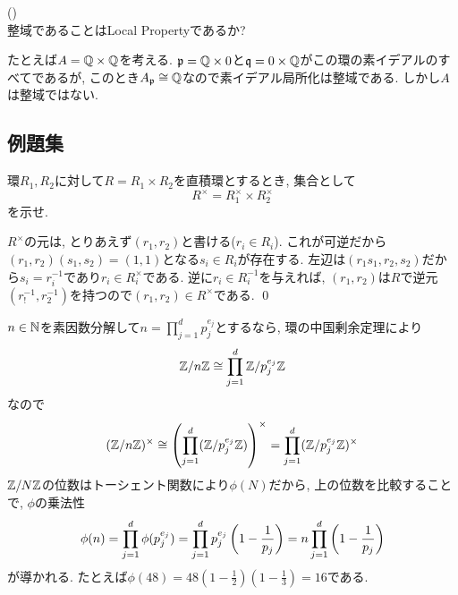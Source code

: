 \begin{egprob} () \\
整域であることはLocal Propertyであるか?
\end{egprob}
\begin{egans}
 たとえば$A=\mathbb{Q}\times \mathbb{Q}$を考える. $\mathfrak{p} = \mathbb{Q}\times 0$と$\mathfrak{q} = 0\times \mathbb{Q}$がこの環の素イデアルのすべてであるが, このとき$A_{\mathfrak{p}} \cong \mathbb{Q}$なので素イデアル局所化は整域である. しかし$A$は整域ではない. \\

\end{egans}













\subsection{例題集}

\begin{egprob}
環$R_1,R_2$に対して$R=R_1\times R_2$を直積環とするとき, 集合として
\[R^{\times} = R_1^{\times} \times R_2^{\times}\]
を示せ.
\end{egprob}
\begin{egans}
$R^{\times}$の元は, とりあえず$(r_1,r_2)$と書ける($r_i \in R_i$). これが可逆だから$(r_1,r_2)(s_1,s_2)=(1,1)$となる$s_i\in R_i$が存在する. 左辺は$(r_1s_1, r_2,s_2)$だから$s_i = r_i^{-1}$であり$r_i \in R_i^{\times}$である. 逆に$r_i\in R_i^{-1}$を与えれば, $(r_1,r_2)$は$R$で逆元$(r_!^{-1}, r_2^{-1})$を持つので$(r_1,r_2)\in R^{\times}$である. \qed
\end{egans}
\begin{eg}
$n\in \mathbb{N}$を素因数分解して$n=\prod_{j=1}^{d} p_j^{e_j}$とするなら, 環の中国剰余定理により
\[\mathbb{Z}/n\mathbb{Z}\cong \prod_{j=1}^{d} \mathbb{Z}/p_j^{e_j}\mathbb{Z} \]
なので
\[(\mathbb{Z}/n\mathbb{Z})^{\times} \cong \left( \prod_{j=1}^{d}(\mathbb{Z}/p_j^{e_j} \mathbb{Z}) \right)^{\times} = \prod_{j=1}^{d} (\mathbb{Z}/p_j^{e_j}\mathbb{Z})^{\times}\]
$\mathbb{Z}/N\mathbb{Z}$の位数はトーシェント関数により$\phi(N)$だから, 上の位数を比較することで, $\phi$の乗法性
\[\phi(n) =  \prod_{j=1}^{d} \phi(p_j^{e_j}) = \prod_{j=1}^{d} p_j^{e_j} \left( 1-\dfrac{1}{p_j} \right) = n\displaystyle\prod_{j=1}^{d} \left( 1-\dfrac{1}{p_j} \right)\]
が導かれる. たとえば$\phi(48) = 48(1- \frac{1}{2})(1-\frac{1}{3}) = 16$である.
\end{eg}

